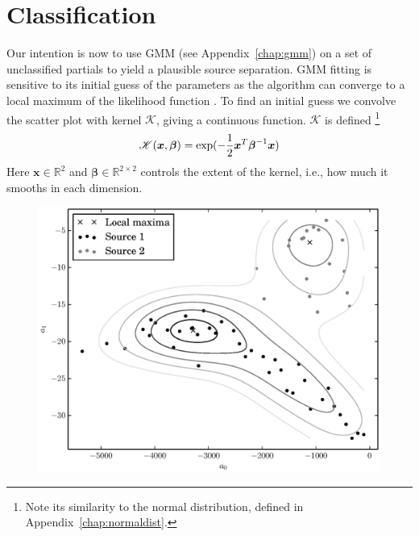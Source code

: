 \section{Classification}

Our intention is now to use GMM (see Appendix~\ref{chap:gmm}) on a set of
unclassified partials to yield a plausible source separation. GMM fitting is
sensitive to its initial guess of the parameters as the algorithm can converge
to a local maximum of the likelihood function
\cite[p.~187]{kay1993fundamentals}.  To find an initial guess we convolve the
scatter plot with kernel $\mathscr{K}$, giving a continuous function.
$\mathscr{K}$ is defined%
\footnote{Note its similarity to the normal distribution, defined in
Appendix~\ref{chap:normaldist}.}
\[
    \mathscr{K}(\boldsymbol{x},\boldsymbol{\beta})
    =
    \exp(\displaystyle-\frac{1}{2}\boldsymbol{x}^{T}\boldsymbol{\beta}^{-1}\boldsymbol{x})
\]
Here $\boldsymbol{x} \in \mathbb{R}^{2}$ and $\boldsymbol{\beta} \in
\mathbb{R}^{2 \times 2}$ controls the extent of the kernel, i.e., how much it
smooths in each dimension. 

\begin{figure}[t]%
    \centering
    \includegraphics[width=\figwidthscale\textwidth]{plots/partial_classification_acgtr_xylo_estimated_memberships.eps}
\end{figure}

